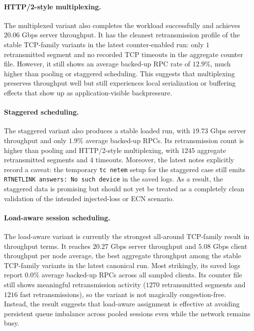 \documentclass[11pt]{article}
\begin{document}
\paragraph{HTTP/2-style multiplexing.}
The multiplexed variant also completes the workload successfully and achieves \(20.06\) Gbps server throughput. It has the cleanest retransmission profile of the stable TCP-family variants in the latest counter-enabled run: only \(1\) retransmitted segment and no recorded TCP timeouts in the aggregate counter file. However, it still shows an average backed-up RPC rate of \(12.9\%\), much higher than pooling or staggered scheduling. This suggests that multiplexing preserves throughput well but still experiences local serialization or buffering effects that show up as application-visible backpressure.

\paragraph{Staggered scheduling.}
The staggered variant also produces a stable loaded run, with \(19.73\) Gbps server throughput and only \(1.9\%\) average backed-up RPCs. Its retransmission count is higher than pooling and HTTP/2-style multiplexing, with \(1245\) aggregate retransmitted segments and \(4\) timeouts. Moreover, the latest notes explicitly record a caveat: the temporary \texttt{tc netem} setup for the staggered case still emits \texttt{RTNETLINK answers: No such device} in the saved logs. As a result, the staggered data is promising but should not yet be treated as a completely clean validation of the intended injected-loss or ECN scenario.

\paragraph{Load-aware session scheduling.}
The load-aware variant is currently the strongest all-around TCP-family result in throughput terms. It reaches \(20.27\) Gbps server throughput and \(5.08\) Gbps client throughput per node average, the best aggregate throughput among the stable TCP-family variants in the latest canonical run. Most strikingly, its saved logs report \(0.0\%\) average backed-up RPCs across all sampled clients. Its counter file still shows meaningful retransmission activity (\(1270\) retransmitted segments and \(1216\) fast retransmissions), so the variant is not magically congestion-free. Instead, the result suggests that load-aware assignment is effective at avoiding persistent queue imbalance across pooled sessions even while the network remains busy.
\end{document}
